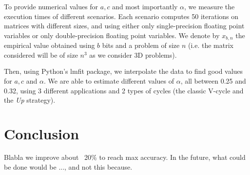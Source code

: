 \documentclass[a4paper,10pt]{article}
\begin{document}
   To provide numerical values for $a,c$ and most importantly $\alpha$, we measure the execution times of different scenarios. Each scenario computes 50 iterations on matrices with different sizes, and using
   either only single-precision floating point variables or only double-precision floating point variables. We denote by $x_{b,n}$ the empirical value obtained using $b$ bits and a problem of size $n$ (i.e. the matrix
   considered will be of size $n^3$ as we consider 3D problems). %
   
   Then, using Python's lmfit package, we interpolate the data to find good values for $a,c$ and $\alpha$. We are able to estimate different values of $\alpha$, all between 0.25 and 0.32, using 3
   different applications and 2 types of cycles (the classic V-cycle and the \emph{Up} strategy).
   
   
   \section{Conclusion}
   
   Blabla we improve about ~20\% to reach max accuracy.
   In the future, what could be done would be ..., and not this because.
   
   
   
\end{document}
